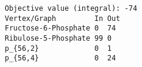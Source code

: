 \begin{verbatim}
Objective value (integral): -74
Vertex/Graph         In Out 
Fructose-6-Phosphate 0  74  
Ribulose-5-Phosphate 99 0   
p_{56,2}             0  1   
p_{56,4}             0  24  
\end{verbatim}
